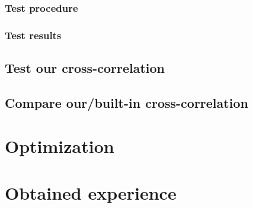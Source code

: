 \subsubsection{Test procedure}
\subsubsection{Test results}

\subsection{Test our cross-correlation}

\subsection{Compare our/built-in cross-correlation}


\section{Optimization}


\section{Obtained experience}
